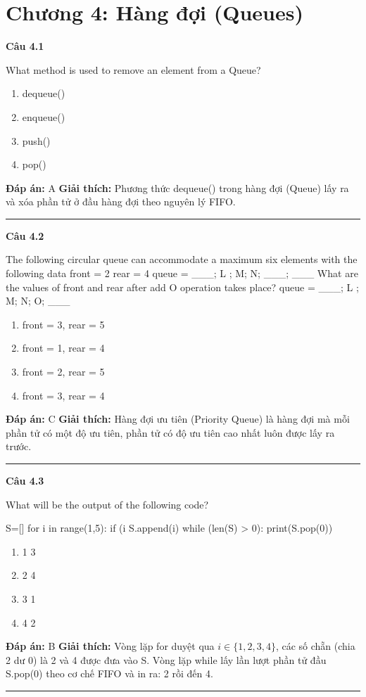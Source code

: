 \documentclass[11pt,a4paper]{article}
\newenvironment{question}[1]{%
  \par\vspace{1em}\noindent\textbf{\large Câu #1}\par\vspace{0.4em}
}{%
  \par\vspace{1em}\hrule\vspace{0.6em}
}
\newenvironment{choices}{%
  \begin{enumerate}[label=\textbf{\Alph*.},leftmargin=2.2em,itemsep=2pt,topsep=3pt]
}{%
  \end{enumerate}
}
\newcommand{\choice}{\item}
\newenvironment{codebox}{%
  \begin{tcolorbox}[colback=gray!8!white,colframe=gray!50!black,arc=1.5mm,boxrule=0.6pt,left=3mm,right=3mm,top=2.5mm,bottom=2.5mm]
  \ttfamily\small
}{%
  \end{tcolorbox}
}
\begin{document}
\newpage
\section*{Chương 4: Hàng đợi (Queues)}


\begin{question}{4.1}
What method is used to remove an element from a Queue?
\begin{choices}
\choice dequeue()
\choice enqueue()
\choice push()
\choice pop()
\end{choices}
\textbf{Đáp án:} A
\textbf{Giải thích:} Phương thức dequeue() trong hàng đợi (Queue) lấy ra và xóa phần tử ở đầu hàng đợi theo nguyên lý FIFO.
\end{question}

\begin{question}{4.2}
The following circular queue can accommodate a maximum six elements with the following data front = 2 rear = 4 queue = ___; L ; M; N; ___; ___ What are the values of front and rear after add O operation takes place? queue = ___; L ; M; N; O; ___
\begin{choices}
\choice front = 3, rear = 5
\choice front = 1, rear = 4
\choice front = 2, rear = 5
\choice front = 3, rear = 4
\end{choices}
\textbf{Đáp án:} C
\textbf{Giải thích:} Hàng đợi ưu tiên (Priority Queue) là hàng đợi mà mỗi phần tử có một độ ưu tiên, phần tử có độ ưu tiên cao nhất luôn được lấy ra trước.
\end{question}

\begin{question}{4.3}
What will be the output of the following code?
\begin{codebox}
S=[]
for i in range(1,5):
    if (i%
        S.append(i)
while (len(S) > 0):
    print(S.pop(0))
\end{codebox}
\begin{choices}
\choice 1 3
\choice 2 4
\choice 3 1
\choice 4 2
\end{choices}
\textbf{Đáp án:} B
\textbf{Giải thích:} Vòng lặp for duyệt qua \(i \in \{1, 2, 3, 4\}\), các số chẵn (chia 2 dư 0) là 2 và 4 được đưa vào S. Vòng lặp while lấy lần lượt phần tử đầu S.pop(0) theo cơ chế FIFO và in ra: 2 rồi đến 4.
\end{question}
\end{document}
